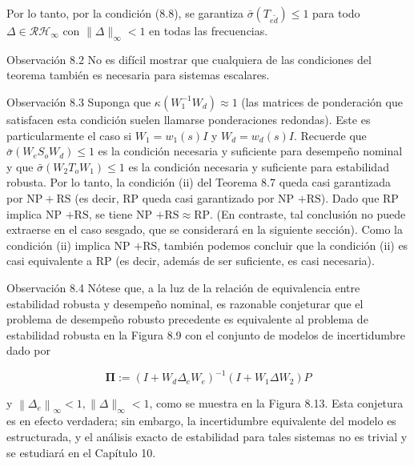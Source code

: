 Por lo tanto, por la condición (8.8), se garantiza $\bar{\sigma}\left(T_{e \tilde{d}}\right) \leq 1$ para todo $\Delta \in \mathcal{R} \mathcal{H}_{\infty}$ con $\|\Delta\|_{\infty}<1$ en todas las frecuencias.

Observación 8.2 No es difícil mostrar que cualquiera de las condiciones del teorema también es necesaria para sistemas escalares.

Observación 8.3 Suponga que $\kappa\left(W_{1}^{-1} W_{d}\right) \approx 1$ (las matrices de ponderación que satisfacen esta condición suelen llamarse ponderaciones redondas). Este es particularmente el caso si $W_{1}=w_{1}(s) I$ y $W_{d}=w_{d}(s) I$. Recuerde que $\bar{\sigma}\left(W_{e} S_{o} W_{d}\right) \leq 1$ es la condición necesaria y suficiente para desempeño nominal y que $\bar{\sigma}\left(W_{2} T_{o} W_{1}\right) \leq 1$ es la condición necesaria y suficiente para estabilidad robusta. Por lo tanto, la condición (ii) del Teorema 8.7 queda casi garantizada por $\mathrm{NP}+\mathrm{RS}$ (es decir, RP queda casi garantizado por NP $+\mathrm{RS}$). Dado que RP implica NP $+\mathrm{RS}$, se tiene NP $+\mathrm{RS} \approx \mathrm{RP}$. (En contraste, tal conclusión no puede extraerse en el caso sesgado, que se considerará en la siguiente sección). Como la condición (ii) implica NP $+\mathrm{RS}$, también podemos concluir que la condición (ii) es casi equivalente a RP (es decir, además de ser suficiente, es casi necesaria).

Observación 8.4 Nótese que, a la luz de la relación de equivalencia entre estabilidad robusta y desempeño nominal, es razonable conjeturar que el problema de desempeño robusto precedente es equivalente al problema de estabilidad robusta en la Figura 8.9 con el conjunto de modelos de incertidumbre dado por

$$
\boldsymbol{\Pi}:=\left(I+W_{d} \Delta_{e} W_{e}\right)^{-1}\left(I+W_{1} \Delta W_{2}\right) P
$$

y $\left\|\Delta_{e}\right\|_{\infty}<1,\|\Delta\|_{\infty}<1$, como se muestra en la Figura 8.13. Esta conjetura es en efecto verdadera; sin embargo, la incertidumbre equivalente del modelo es estructurada, y el análisis exacto de estabilidad para tales sistemas no es trivial y se estudiará en el Capítulo 10.


